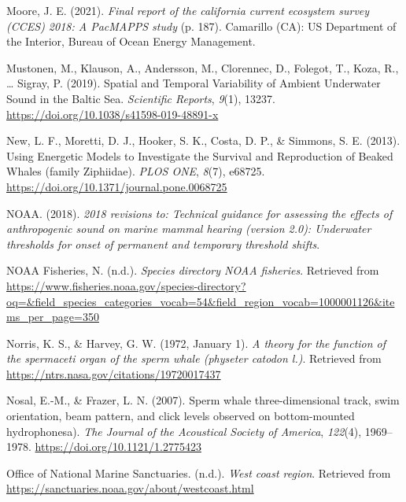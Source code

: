 \documentclass[
]{article}
\newlength{\cslhangindent}
\newlength{\cslentryspacingunit} %
\newenvironment{CSLReferences}[2] %
 {%
  \setlength{\parindent}{0pt}
  \ifodd #1
  \let\oldpar\par
  \def\par{\hangindent=\cslhangindent\oldpar}
  \fi
  \setlength{\parskip}{#2\cslentryspacingunit}
 }%
 {}
\begin{document}
\begin{CSLReferences}{1}{0}
\leavevmode{}%
Moore, J. E. (2021). \emph{Final report of the california current
ecosystem survey (CCES) 2018: A PacMAPPS study} (p. 187). Camarillo
(CA): US Department of the Interior, Bureau of Ocean Energy Management.

\leavevmode{}%
Mustonen, M., Klauson, A., Andersson, M., Clorennec, D., Folegot, T.,
Koza, R., \ldots{} Sigray, P. (2019). Spatial and Temporal Variability
of Ambient Underwater Sound in the Baltic Sea. \emph{Scientific
Reports}, \emph{9}(1), 13237.
\url{https://doi.org/10.1038/s41598-019-48891-x}

\leavevmode{}%
New, L. F., Moretti, D. J., Hooker, S. K., Costa, D. P., \& Simmons, S.
E. (2013). Using Energetic Models to Investigate the Survival and
Reproduction of Beaked Whales (family Ziphiidae). \emph{PLOS ONE},
\emph{8}(7), e68725. \url{https://doi.org/10.1371/journal.pone.0068725}

\leavevmode{}%
NOAA. (2018). \emph{2018 revisions to: Technical guidance for assessing
the effects of anthropogenic sound on marine mammal hearing (version
2.0): Underwater thresholds for onset of permanent and temporary
threshold shifts}.

\leavevmode{}%
NOAA Fisheries, N. (n.d.). \emph{Species directory \textbar{} NOAA
fisheries}. Retrieved from
\url{https://www.fisheries.noaa.gov/species-directory?oq=\&field_species_categories_vocab=54\&field_region_vocab=1000001126\&items_per_page=350}

\leavevmode{}%
Norris, K. S., \& Harvey, G. W. (1972, January 1). \emph{A theory for
the function of the spermaceti organ of the sperm whale (physeter
catodon l.)}. Retrieved from
\url{https://ntrs.nasa.gov/citations/19720017437}

\leavevmode{}%
Nosal, E.-M., \& Frazer, L. N. (2007). Sperm whale three-dimensional
track, swim orientation, beam pattern, and click levels observed on
bottom-mounted hydrophonesa). \emph{The Journal of the Acoustical
Society of America}, \emph{122}(4), 1969--1978.
\url{https://doi.org/10.1121/1.2775423}

\leavevmode{}%
Office of National Marine Sanctuaries. (n.d.). \emph{West coast region}.
Retrieved from \url{https://sanctuaries.noaa.gov/about/westcoast.html}


\end{CSLReferences}
\end{document}
